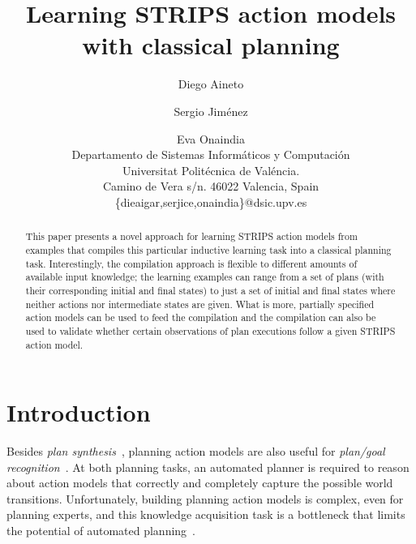 \documentclass[letterpaper]{article} %
\begin{document}
\title{Learning STRIPS action models with classical planning}

\author{Diego Aineto\and Sergio Jim\'enez\and Eva Onaindia\\
{\small Departamento de Sistemas Inform\'aticos y Computaci\'on}\\
{\small Universitat Polit\'ecnica de Val\'encia.}\\
{\small Camino de Vera s/n. 46022 Valencia, Spain}\\
{\small \{dieaigar,serjice,onaindia\}@dsic.upv.es}}
 
\maketitle
\begin{abstract}
This paper presents a novel approach for learning STRIPS action models from examples that compiles this particular inductive learning task into a classical planning task. Interestingly, the compilation approach is flexible to different amounts of available input knowledge; the learning examples can range from a set of plans (with their corresponding initial and final states) to just a set of initial and final states where neither actions nor intermediate states are given. What is more, partially specified action models can be used to feed the compilation and the compilation can also be used to validate whether certain observations of plan executions follow a given STRIPS action model.
\end{abstract}


\section{Introduction}
Besides {\em plan synthesis}~\cite{ghallab2004automated,geffner:book:2013}, planning action models are also useful for {\em plan/goal recognition}~\cite{ramirez2012plan}. At both planning tasks, an automated planner is required to reason about action models that correctly and completely capture the possible world transitions. Unfortunately, building planning action models is complex, even for planning experts, and this knowledge acquisition task is a bottleneck that limits the potential of automated planning~\cite{kambhampati:modellite:AAAI2007}.  
\end{document}
